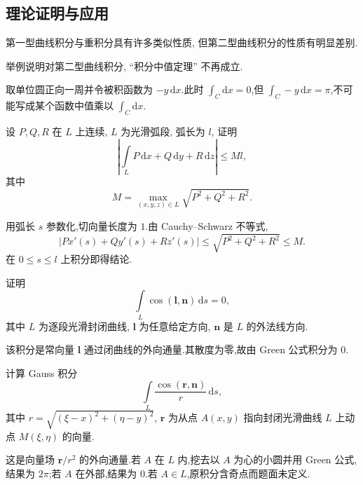\subsection{理论证明与应用}

第一型曲线积分与重积分具有许多类似性质, 但第二型曲线积分的性质有明显差别.

\begin{example}
    举例说明对第二型曲线积分, ``积分中值定理'' 不再成立.
\end{example}
\exampleblank

\begin{solution}
    取单位圆正向一周并令被积函数为 $-y\,\mathrm{d}x$.此时 $\int_C\mathrm{d}x=0$,但 $\int_C-y\,\mathrm{d}x=\pi$,不可能写成某个函数中值乘以 $\int_C\mathrm{d}x$.
\end{solution}

\begin{example}
    设 $P,Q,R$ 在 $L$ 上连续, $L$ 为光滑弧段, 弧长为 $l$, 证明
    \[
        \left|\int\limits_LP\,\mathrm{d}x+Q\,\mathrm{d}y+R\,\mathrm{d}z\right|\leq Ml,
    \]
    其中
    \[
        M=\max_{(x,y,z)\in L}\sqrt{P^2+Q^2+R^2}.
    \]
\end{example}
\exampleblank

\begin{solution}
    用弧长 $s$ 参数化,切向量长度为 $1$.由 Cauchy--Schwarz 不等式,
    \[
        |P x'(s)+Q y'(s)+R z'(s)|\leq\sqrt{P^2+Q^2+R^2}\leq M.
    \]
    在 $0\leq s\leq l$ 上积分即得结论.
\end{solution}

\begin{example}
    证明
    \[
        \int\limits_L\cos(\bm l,\bm n)\,\mathrm{d}s=0,
    \]
    其中 $L$ 为逐段光滑封闭曲线, $\bm l$ 为任意给定方向, $\bm n$ 是 $L$ 的外法线方向.
\end{example}
\exampleblank

\begin{solution}
    该积分是常向量 $\bm l$ 通过闭曲线的外向通量.其散度为零,故由 Green 公式积分为 $0$.
\end{solution}

\begin{example}
    计算 Gauss 积分
    \[
        \int\limits_L\dfrac{\cos(\bm r,\bm n)}{r}\,\mathrm{d}s,
    \]
    其中 $r=\sqrt{(\xi-x)^2+(\eta-y)^2}$, $\bm r$ 为从点 $A(x,y)$ 指向封闭光滑曲线 $L$ 上动点 $M(\xi,\eta)$ 的向量.
\end{example}
\exampleblank

\begin{solution}
    这是向量场 $\bm r/r^2$ 的外向通量.若 $A$ 在 $L$ 内,挖去以 $A$ 为心的小圆并用 Green 公式,结果为 $2\pi$;若 $A$ 在外部,结果为 $0$.若 $A\in L$,原积分含奇点而题面未定义.
\end{solution}


